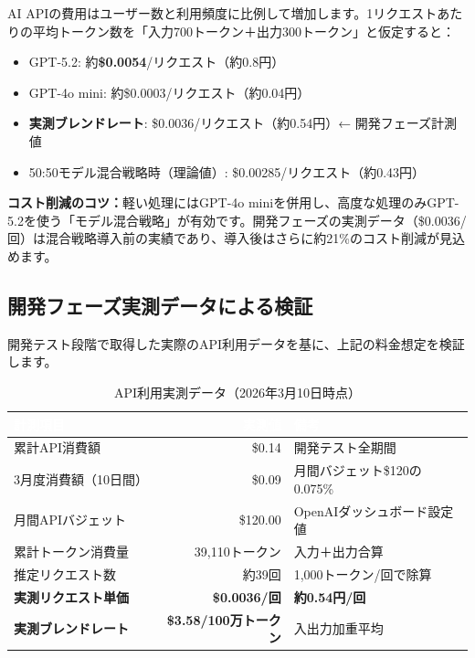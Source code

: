 \documentclass[a4paper,11pt]{ltjsarticle}
\begin{document}
\begin{warnbox}[API費用は変動費の最大要因]
AI APIの費用はユーザー数と利用頻度に比例して増加します。1リクエストあたりの平均トークン数を「入力700トークン＋出力300トークン」と仮定すると：

\begin{itemize}
  \item GPT-5.2: 約\textbf{\$0.0054}/リクエスト（約0.8円）
  \item GPT-4o mini: 約\$0.0003/リクエスト（約0.04円）
  \item \textbf{実測ブレンドレート}: \$0.0036/リクエスト（約0.54円）← 開発フェーズ計測値
  \item 50:50モデル混合戦略時（理論値）: \$0.00285/リクエスト（約0.43円）
\end{itemize}

\textbf{コスト削減のコツ：}軽い処理にはGPT-4o miniを併用し、高度な処理のみGPT-5.2を使う「モデル混合戦略」が有効です。開発フェーズの実測データ（\$0.0036/回）は混合戦略導入前の実績であり、導入後はさらに約21\%のコスト削減が見込めます。
\end{warnbox}

\subsection{開発フェーズ実測データによる検証}

開発テスト段階で取得した実際のAPI利用データを基に、上記の料金想定を検証します。

\begin{table}[H]
\centering
\caption{API利用実測データ（2026年3月10日時点）}
\begin{tabular}{lrl}
\toprule
\rowcolor{headerblue}\textcolor{white}{\textbf{計測項目}} & \textcolor{white}{\textbf{実測値}} & \textcolor{white}{\textbf{備考}} \\
\midrule
累計API消費額 & \$0.14 & 開発テスト全期間 \\
\rowcolor{lightgray}
3月度消費額（10日間） & \$0.09 & 月間バジェット\$120の0.075\% \\
月間APIバジェット & \$120.00 & OpenAIダッシュボード設定値 \\
\rowcolor{lightgray}
累計トークン消費量 & 39,110トークン & 入力＋出力合算 \\
推定リクエスト数 & 約39回 & 1,000トークン/回で除算 \\
\rowcolor{lightgray}
\textbf{実測リクエスト単価} & \textbf{\$0.0036/回} & \textbf{約0.54円/回} \\
\textbf{実測ブレンドレート} & \textbf{\$3.58/100万トークン} & 入出力加重平均 \\
\bottomrule
\end{tabular}
\end{table}
\end{document}
